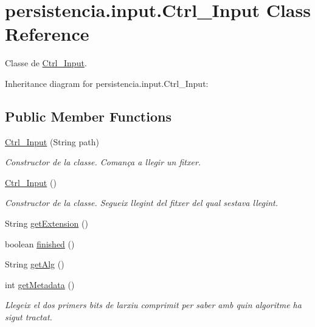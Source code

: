 \hypertarget{classpersistencia_1_1input_1_1Ctrl__Input}{}\section{persistencia.\+input.\+Ctrl\+\_\+\+Input Class Reference}
\label{classpersistencia_1_1input_1_1Ctrl__Input}


Classe de \hyperlink{classpersistencia_1_1input_1_1Ctrl__Input}{Ctrl\+\_\+\+Input}.  




Inheritance diagram for persistencia.\+input.\+Ctrl\+\_\+\+Input\+:
\subsection*{Public Member Functions}
\begin{DoxyCompactItemize}
\item 
\hyperlink{classpersistencia_1_1input_1_1Ctrl__Input_a00f3fa14d0329d6e4b9ddbe39ada1258}{Ctrl\+\_\+\+Input} (String path)
\begin{DoxyCompactList}\small\item\em Constructor de la classe. Comança a llegir un fitxer. \end{DoxyCompactList}\item 
\hyperlink{classpersistencia_1_1input_1_1Ctrl__Input_a817ed61e715eb12261d844de34d84bec}{Ctrl\+\_\+\+Input} ()
\begin{DoxyCompactList}\small\item\em Constructor de la classe. Segueix llegint del fitxer del qual s\textquotesingle{}estava llegint. \end{DoxyCompactList}\item 
String \hyperlink{classpersistencia_1_1input_1_1Ctrl__Input_a46d569c2f3ceb0ab6cf9900708b3316a}{get\+Extension} ()
\item 
boolean \hyperlink{classpersistencia_1_1input_1_1Ctrl__Input_a5a94d207dce0fd592b5ac17f55154d4f}{finished} ()
\item 
String \hyperlink{classpersistencia_1_1input_1_1Ctrl__Input_aa69f79fb581f6d80c5a9609148794570}{get\+Alg} ()
\item 
int \hyperlink{classpersistencia_1_1input_1_1Ctrl__Input_a46e05fce164a6803820c02565c1769c8}{get\+Metadata} ()
\begin{DoxyCompactList}\small\item\em Llegeix el dos primers bits de l\textquotesingle{}arxiu comprimit per saber amb quin algoritme ha sigut tractat. \end{DoxyCompactList}\end{DoxyCompactItemize}
